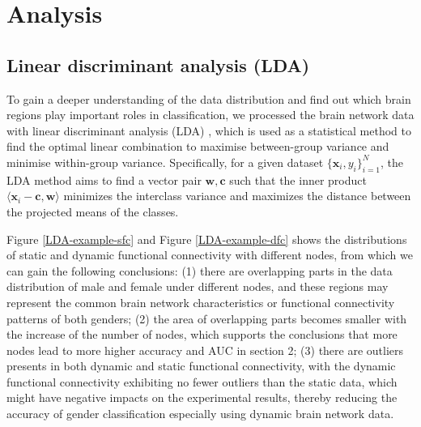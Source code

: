 \documentclass[11pt]{article}
\begin{document}
\section{Analysis}

\subsection{Linear discriminant analysis (LDA)}

To gain a deeper understanding of the data distribution and find out which brain regions play important roles in classification, we processed the brain network data with linear discriminant analysis (LDA) \cite{Goldstein1976-aj}, which is used as a statistical method to find the optimal linear combination to maximise between-group variance and minimise within-group variance. Specifically, for a given dataset $\{\mathbf{x}_i, y_i\}_{i=1}^N$, the LDA method aims to find a vector pair $\mathbf{w}, \mathbf{c}$ such that the inner product $\langle \mathbf{x}_i  - \mathbf{c}, \mathbf{w} \rangle$ minimizes the interclass variance and maximizes the distance between the projected means of the classes.

Figure \ref{LDA-example-sfc} and Figure \ref{LDA-example-dfc} shows the distributions of static and dynamic functional connectivity with different nodes, from which we can gain the following conclusions: (1) there are overlapping parts in the data distribution of male and female under different nodes, and these regions may represent the common brain network characteristics or functional connectivity patterns of both genders; (2) the area of overlapping parts becomes smaller with the increase of the number of nodes, which supports the conclusions that more nodes lead to more higher accuracy and AUC in section 2; (3) there are outliers presents in both dynamic and static functional connectivity, with the dynamic functional connectivity exhibiting no fewer outliers than the static data, which might have negative impacts on the experimental results, thereby reducing the accuracy of gender classification especially using dynamic brain network data.
\end{document}
